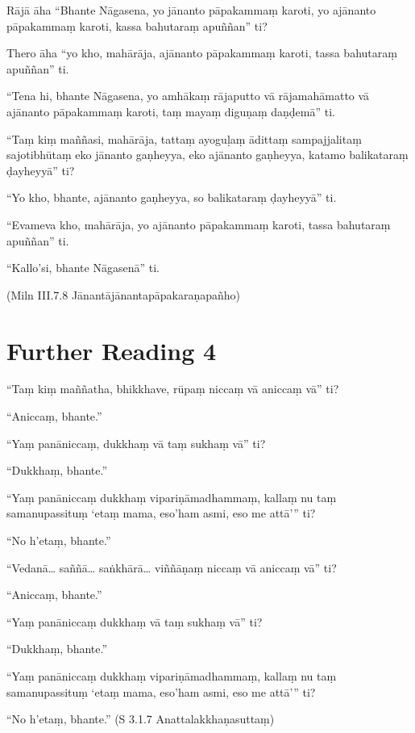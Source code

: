 Rājā āha “Bhante Nāgasena, yo jānanto pāpakammaṃ karoti, yo ajānanto pāpakammaṃ karoti, kassa bahutaraṃ apuññan” ti?

Thero āha “yo kho, mahārāja, ajānanto pāpakammaṃ karoti, tassa bahutaraṃ apuññan” ti.

“Tena hi, bhante Nāgasena, yo amhākaṃ rājaputto vā rājamahāmatto vā ajānanto pāpakammaṃ karoti, taṃ mayaṃ diguṇaṃ daṇḍemā” ti.

“Taṃ kiṃ maññasi, mahārāja, tattaṃ ayoguḷaṃ ādittaṃ sampajjalitaṃ sajotibhūtaṃ eko jānanto gaṇheyya, eko ajānanto gaṇheyya, katamo balikataraṃ ḍayheyyā” ti?

“Yo kho, bhante, ajānanto gaṇheyya, so balikataraṃ ḍayheyyā” ti.

“Evameva kho, mahārāja, yo ajānanto pāpakammaṃ karoti, tassa bahutaraṃ apuññan” ti.

“Kallo’si, bhante Nāgasenā” ti.

(Miln III.7.8 Jānantājānantapāpakaraṇapañho)

\section*{Further Reading 4}

“Taṃ kiṃ maññatha, bhikkhave, rūpaṃ niccaṃ vā aniccaṃ vā” ti?

“Aniccaṃ, bhante.”

“Yaṃ panāniccaṃ, dukkhaṃ vā taṃ sukhaṃ vā” ti?

“Dukkhaṃ, bhante.”

“Yaṃ panāniccaṃ dukkhaṃ vipariṇāmadhammaṃ, kallaṃ nu taṃ samanupassituṃ ‘etaṃ mama, eso’ham asmi, eso me attā’” ti?

“No h’etaṃ, bhante.”

“Vedanā… saññā… saṅkhārā… viññāṇaṃ niccaṃ vā aniccaṃ vā” ti?

“Aniccaṃ, bhante.”

“Yaṃ panāniccaṃ dukkhaṃ vā taṃ sukhaṃ vā” ti?

“Dukkhaṃ, bhante.”

“Yaṃ panāniccaṃ dukkhaṃ vipariṇāmadhammaṃ, kallaṃ nu taṃ samanupassituṃ ‘etaṃ mama, eso’ham asmi, eso me attā’” ti?

“No h’etaṃ, bhante.” (S 3.1.7 Anattalakkhaṇasuttaṃ)